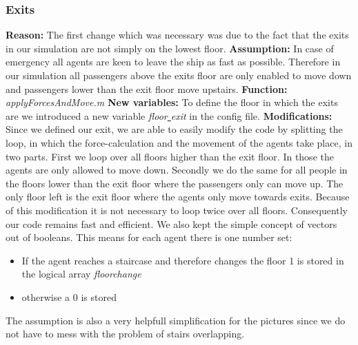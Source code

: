 \documentclass[11pt]{article}
\begin{document}
\subsubsection{Exits}
\textbf{Reason:}
\newline
The first change which was necessary was due to the fact that the exits in our simulation are not simply on the lowest floor.
\newline
\textbf{Assumption:}
\newline
In case of emergency all agents are keen to leave the ship as fast as possible. Therefore in our simulation all passengers above the exits floor are only enabled to move down and passengers lower than the exit floor move upstairs.
\newline
\textbf{Function:}
\newline
\textit{applyForcesAndMove.m}
\newline
\textbf{New variables:}
\newline 
To define the floor in which the exits are we introduced a new variable \textit{floor\underline{ }exit} in the config file.
\newline
\textbf{Modifications:}
\newline
Since we defined our exit, we are able to easily modify the code by splitting the loop, in which the force-calculation and the movement of the agents take place, in two parts. First we loop over all floors higher than the exit floor. In those the agents are only allowed to move down. Secondly we do the same for all people in the floors lower than the exit floor where the passengers only can move up. The only floor left is the exit floor where the agents only move towards exits.
\newline
Because of this modification it is not necessary to loop twice over all floors. Consequently our code remains fast and efficient. We also kept the simple concept of vectors out of booleans. This means for each agent there is one number set: 
\begin{itemize}
\item If the agent reaches a staircase and therefore changes the floor 1 is stored in the logical array \textit{floorchange}
\item otherwise a 0 is stored
\end{itemize}
The assumption is also a very helpfull simplification for the pictures since we do not have to mess with the problem of stairs overlapping.
\end{document}
